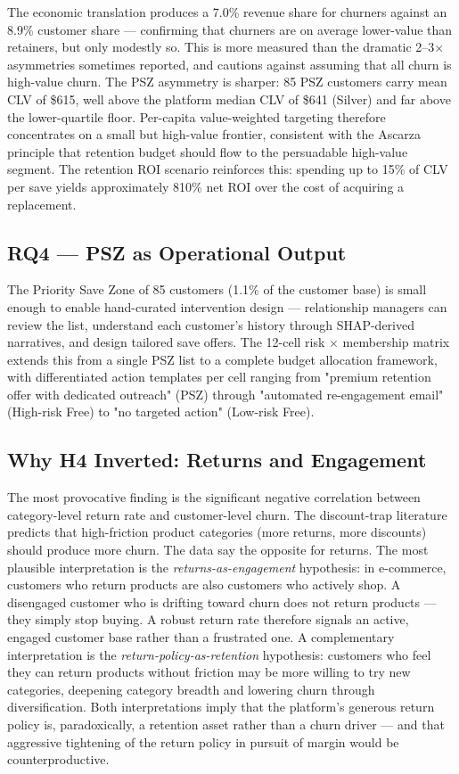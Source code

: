 \documentclass[conference]{IEEEtran}
\begin{document}
The economic translation produces a 7.0\% revenue share for churners against an 8.9\% customer share — confirming that churners are on average lower-value than retainers, but only modestly so. This is more measured than the dramatic 2--3$\times$ asymmetries sometimes reported, and cautions against assuming that all churn is high-value churn. The PSZ asymmetry is sharper: 85 PSZ customers carry mean CLV of \$615, well above the platform median CLV of \$641 (Silver) and far above the lower-quartile floor. Per-capita value-weighted targeting therefore concentrates on a small but high-value frontier, consistent with the Ascarza \cite{ascarza2018} principle that retention budget should flow to the persuadable high-value segment. The retention ROI scenario reinforces this: spending up to 15\% of CLV per save yields approximately 810\% net ROI over the cost of acquiring a replacement.

\subsection{RQ4 — PSZ as Operational Output}

The Priority Save Zone of 85 customers (1.1\% of the customer base) is small enough to enable hand-curated intervention design — relationship managers can review the list, understand each customer's history through SHAP-derived narratives, and design tailored save offers. The 12-cell risk $\times$ membership matrix extends this from a single PSZ list to a complete budget allocation framework, with differentiated action templates per cell ranging from "premium retention offer with dedicated outreach" (PSZ) through "automated re-engagement email" (High-risk Free) to "no targeted action" (Low-risk Free).

\subsection{Why H4 Inverted: Returns and Engagement}

The most provocative finding is the significant negative correlation between category-level return rate and customer-level churn. The discount-trap literature predicts that high-friction product categories (more returns, more discounts) should produce more churn. The data say the opposite for returns. The most plausible interpretation is the \emph{returns-as-engagement} hypothesis: in e-commerce, customers who return products are also customers who actively shop. A disengaged customer who is drifting toward churn does not return products — they simply stop buying. A robust return rate therefore signals an active, engaged customer base rather than a frustrated one. A complementary interpretation is the \emph{return-policy-as-retention} hypothesis: customers who feel they can return products without friction may be more willing to try new categories, deepening category breadth and lowering churn through diversification. Both interpretations imply that the platform's generous return policy is, paradoxically, a retention asset rather than a churn driver — and that aggressive tightening of the return policy in pursuit of margin would be counterproductive.
\end{document}
